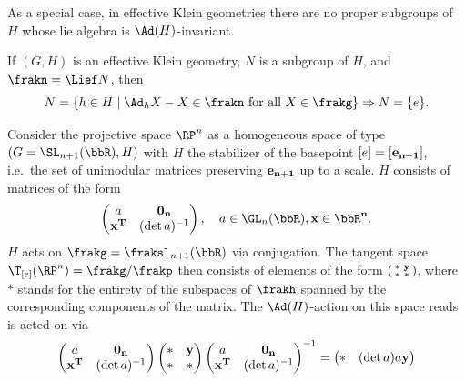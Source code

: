 As a special case, in effective Klein geometries there are no proper subgroups of $H$ whose lie algebra is $\Ad(H)$-invariant.

\begin{cor}\label{Cor 4.2 Sharpe}
    If $(G,H)$ is an effective Klein geometry, $N$ is a subgroup of $H$, and $\frakn=\Lief N$, then
    \[N=\{h\in H\mid \Ad_h X-X\in\frakn \text{ for all }X\in\frakg\}\Rightarrow N=\{e\}.\]
\end{cor}

\begin{example}\label{ex real projective Klein model}
    Consider the projective space $\RP^n$ as a homogeneous space of type $(G=\SL_{n+1}(\bbR),H)$ with $H$ the stabilizer of the basepoint $[e]=[\bf{e}_{n+1}]$, i.e.\ the set of unimodular matrices preserving $\bf{e}_{n+1}$ up to a scale. $H$ consists of matrices of the form 
    \[ \begin{pmatrix}
        a & \bf{0}_n \\
        \bf{x}^T & (\det a)^{-1} 
    \end{pmatrix},\quad a\in \GL_n(\bbR),\bf{x}\in\bbR^n.\]
    $H$ acts on $\frakg=\fraksl_{n+1}(\bbR)$ via conjugation. The tangent space $\T_{[e]}(\RP^n)=\frakg\slash\frakp$ then consists of elements of the form 
    $\left(\begin{smallmatrix}
        \ast & \bf{y} \\
        \ast & \ast
    \end{smallmatrix}\right)$, where $\ast$ stands for the entirety of the subspaces of $\frakh$ spanned by the corresponding components of the matrix. The $\Ad(H)$-action on this space reads 
    is acted on via 
    \[\begin{pmatrix}
        a & \bf{0}_n\\
        \bf{x}^T & (\det a)^{-1}
    \end{pmatrix}
    \begin{pmatrix}
        \ast & \bf{y} \\
        \ast & \ast 
    \end{pmatrix}
    \begin{pmatrix}
        a & \bf{0}_n\\
        \bf{x}^T & (\det a)^{-1}
    \end{pmatrix}^{-1}=
    \begin{pmatrix}
        \ast & (\det a) a\bf{y} \\

\end{pmatrix}\]
\end{example}
